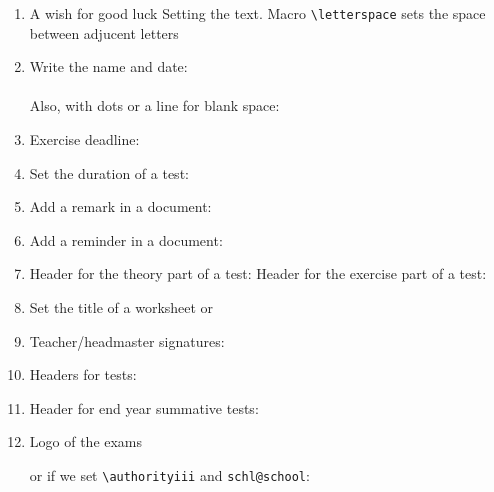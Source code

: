 \documentclass[12pt,a4page]{article}
\begin{document}
\begin{enumerate}
\item A wish for good luck
  \wish
  Setting the text. Macro \verb/\letterspace/ sets the space between adjucent letters
  \makeatletter
  \def\schl@wish{\letterspace{10} ΚΑΛΗ ΤΥΧΗ}
  \makeatother
  \wish
\item Write the name and date:\hspace{2em} \fullname{}\\
  \datefield{} \\
  Also, with dots or a line for blank space: \hspace{3em} \\ \datefield{\blankspace{10em}}
\item Exercise deadline: \hspace{3em} \\
\item Set the duration of a test:\\ 
\item Add a remark in a document:\\ 
\item Add a reminder in a document:\\ 
\item Header for the theory part of a test: \theorypart
  Header for the exercise part of a test: \exercisepart
\item Set the title of a worksheet
  \worksheethd{}
  or
\item Teacher/headmaster signatures:\\
  \hfill
\item Headers for tests:
  \examhd{}
\item Header for end year summative tests:
\item Logo of the  exams

  \authoritylogo

  or if we set \verb+\authorityiii+ and \verb+schl@school+:


\end{enumerate}
\end{document}
